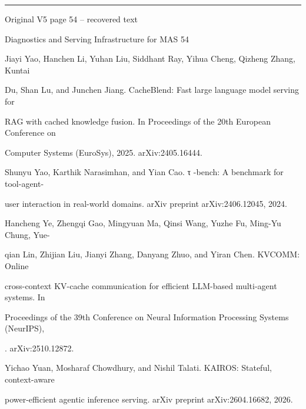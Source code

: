 \par\smallskip\noindent\rule{\textwidth}{0.4pt}\par{\sffamily\footnotesize Original V5 page 54 -- recovered text}\par\begin{flushleft}\footnotesize\ttfamily
\par\smallskip
\par\smallskip
\noindent Diagnostics and Serving Infrastructure for MAS 54\par
\par\smallskip
\par\smallskip
\par\smallskip
\noindent [41] Jiayi Yao, Hanchen Li, Yuhan Liu, Siddhant Ray, Yihua Cheng, Qizheng Zhang, Kuntai\par
\noindent  Du, Shan Lu, and Junchen Jiang. CacheBlend: Fast large language model serving for\par
\noindent  RAG with cached knowledge fusion. In Proceedings of the 20th European Conference on\par
\noindent  Computer Systems (EuroSys), 2025. arXiv:2405.16444.\par
\par\smallskip
\noindent [42] Shunyu Yao, Karthik Narasimhan, and Yian Cao. τ -bench: A benchmark for tool-agent-\par
\noindent  user interaction in real-world domains. arXiv preprint arXiv:2406.12045, 2024.\par
\par\smallskip
\noindent [43] Hancheng Ye, Zhengqi Gao, Mingyuan Ma, Qinsi Wang, Yuzhe Fu, Ming-Yu Chung, Yue-\par
\noindent  qian Lin, Zhijian Liu, Jianyi Zhang, Danyang Zhuo, and Yiran Chen. KVCOMM: Online\par
\noindent  cross-context KV-cache communication for efficient LLM-based multi-agent systems. In\par
\noindent  Proceedings of the 39th Conference on Neural Information Processing Systems (NeurIPS),\par
{}. arXiv:2510.12872.\par
\par\smallskip
\noindent [44] Yichao Yuan, Mosharaf Chowdhury, and Nishil Talati. KAIROS: Stateful, context-aware\par
\noindent  power-efficient agentic inference serving. arXiv preprint arXiv:2604.16682, 2026.\par

\end{flushleft}
